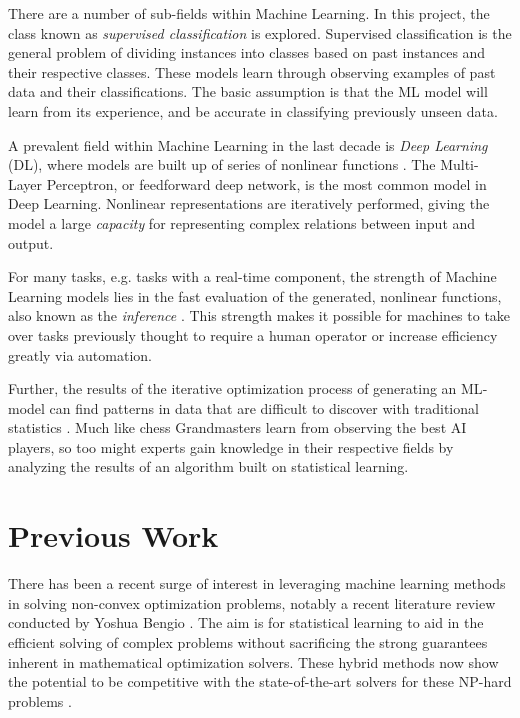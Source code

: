 There are a number of sub-fields within Machine Learning. In this project, the class known as \textit{supervised classification} is explored. Supervised classification is the general problem of dividing instances into classes based on past instances and their respective classes. These models learn through observing examples of past data and their classifications. The basic assumption is that the \gls{ML} model will learn from its experience, and be accurate in classifying previously unseen data. 

A prevalent field within Machine Learning in the last decade is \textit{Deep Learning} (DL), where models are built up of series of nonlinear functions \cite{goodfellow2016deep}. 
The Multi-Layer Perceptron, or feedforward deep network, is the most common model in Deep Learning. Nonlinear representations are iteratively performed, giving the model a large \textit{capacity} for representing complex relations between input and output. 

For many tasks, e.g. tasks with a real-time component, the strength of Machine Learning models lies in the fast evaluation of the generated, nonlinear functions, also known as the \textit{inference} \cite{bertsimas2019online}. This strength makes it possible for machines to take over tasks previously thought to require a human operator or increase efficiency greatly via automation.

Further, the results of the iterative optimization process of generating an \gls{ML}-model can find patterns in data that are difficult to discover with traditional statistics \cite{goodfellow2016deep}. Much like chess Grandmasters learn from observing the best \gls{AI} players, so too might experts gain knowledge in their respective fields by analyzing the results of an algorithm built on statistical learning.  



\section{Previous Work}\label{sec:previouswork}

There has been a recent surge of interest in leveraging machine learning methods in solving non-convex optimization problems, notably a recent literature review conducted by Yoshua Bengio \cite{bengio2020machine}. The aim is for statistical learning to aid in the efficient solving of complex problems without sacrificing the strong guarantees inherent in mathematical optimization solvers. These hybrid methods now show the potential to be competitive with the state-of-the-art solvers for these \gls{NP}-hard problems \cite{gasse2019exact}. 

